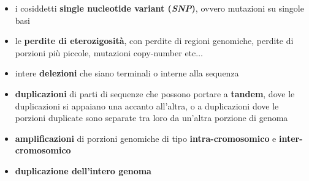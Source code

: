 \documentclass[a4paper,12pt, oneside]{book}
\begin{document}
\begin{itemize}
  \item i cosiddetti \textbf{single nucleotide variant (\textit{SNP})}, ovvero
  mutazioni su singole basi
  \item le \textbf{perdite di eterozigosità}, con perdite di regioni genomiche,
  perdite di porzioni più piccole, mutazioni copy-number etc$\ldots$
  \item intere \textbf{delezioni} che siano terminali o interne alla sequenza
  \item \textbf{duplicazioni} di parti di sequenze che possono portare a
  \textbf{tandem}, dove le duplicazioni si appaiano una accanto all'altra, o a
  duplicazioni dove le porzioni duplicate sono separate tra loro da un'altra
  porzione di genoma
  \item \textbf{amplificazioni} di porzioni genomiche di tipo
  \textbf{intra-cromosomico} e \textbf{inter-cromosomico}
  \item \textbf{duplicazione dell'intero genoma}
\end{itemize}
\end{document}
